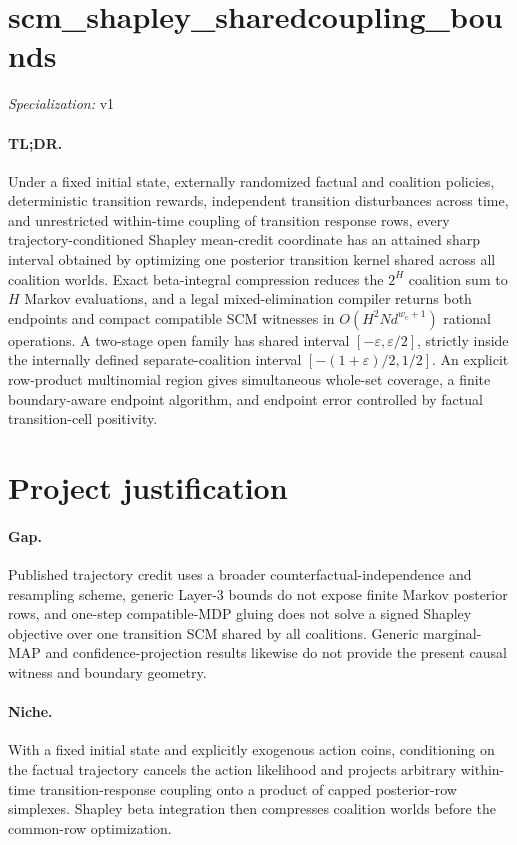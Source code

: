 \documentclass{article}
\begin{document}
\sloppy

\section*{scm\_\allowbreak{}shapley\_\allowbreak{}sharedcoupling\_\allowbreak{}bounds}

\noindent\textit{Specialization:} v1\par

\paragraph{TL;DR.} Under a fixed initial state, externally randomized factual and coalition policies, deterministic transition rewards, independent transition disturbances across time, and unrestricted within-time coupling of transition response rows, every trajectory-conditioned Shapley mean-credit coordinate has an attained sharp interval obtained by optimizing one posterior transition kernel shared across all coalition worlds.  Exact beta-integral compression reduces the \(2^H\) coalition sum to \(H\) Markov evaluations, and a legal mixed-elimination compiler returns both endpoints and compact compatible SCM witnesses in \(O(H^2Nd^{w_{\mathrm c}+1})\) rational operations.  A two-stage open family has shared interval \([-\varepsilon,\varepsilon/2]\), strictly inside the internally defined separate-coalition interval \([-(1+\varepsilon)/2,1/2]\).  An explicit row-product multinomial region gives simultaneous whole-set coverage, a finite boundary-aware endpoint algorithm, and endpoint error controlled by factual transition-cell positivity.

\section{Project justification}

\paragraph{Gap.} Published trajectory credit uses a broader counterfactual-independence and resampling scheme, generic Layer-3 bounds do not expose finite Markov posterior rows, and one-step compatible-MDP gluing does not solve a signed Shapley objective over one transition SCM shared by all coalitions.  Generic marginal-MAP and confidence-projection results likewise do not provide the present causal witness and boundary geometry.

\paragraph{Niche.} With a fixed initial state and explicitly exogenous action coins, conditioning on the factual trajectory cancels the action likelihood and projects arbitrary within-time transition-response coupling onto a product of capped posterior-row simplexes.  Shapley beta integration then compresses coalition worlds before the common-row optimization.
\end{document}
